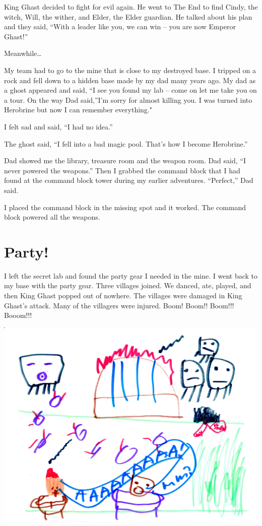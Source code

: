 \documentclass[12pt,twoside]{krantz}
\begin{document}
King Ghast decided to fight for evil again. He went to The End to find
Cindy, the witch, Will, the wither, and Elder, the Elder guardian. He
talked about his plan and they said, ``With a leader like you, we can
win -- you are now Emperor Ghast!''

Meanwhile\ldots{}

My team had to go to the mine that is close to my destroyed base. I
tripped on a rock and fell down to a hidden base made by my dad many
years ago. My dad as a ghost appeared and said, ``I see you found my lab
-- come on let me take you on a tour. On the way Dad said,''I'm sorry
for almost killing you. I was turned into Herobrine but now I can
remember everything."

I felt sad and said, ``I had no idea.''

The ghost said, ``I fell into a bad magic pool. That's how I become
Herobrine.''

Dad showed me the library, treasure room and the weapon room. Dad said,
``I never powered the weapons.'' Then I grabbed the command block that I
had found at the command block tower during my earlier adventures.
``Perfect,'' Dad said.

I placed the command block in the missing spot and it worked. The
command block powered all the weapons.

\hypertarget{party}{%
\section{Party!}\label{party}}

I left the secret lab and found the party gear I needed in the mine. I
went back to my base with the party gear. Three villages joined. We
danced, ate, played, and then King Ghast popped out of nowhere. The
villages were damaged in King Ghast's attack. Many of the villagers were
injured. Boom! Boom!! Boom!!! Booom!!!

\includegraphics[width=5.20833in,height=\textheight]{img/king-ghast/04-everyone.jpg}
\end{document}
